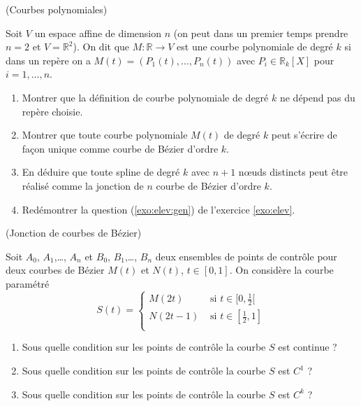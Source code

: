 \documentclass[a4paper,12pt,reqno]{amsart}
\begin{document}
\begin{exo} (Courbes polynomiales)

    Soit $V$ un espace affine de dimension $n$ (on peut dans un premier temps prendre $n=2$ et $V=\mathbb{R}^{2}$). On dit que $M:\mathbb{R} \rightarrow V$ est une courbe polynomiale de degré $k$ si dans un repère on a $M(t) = (P_{1}(t),\ldots,P_{n}(t))$ avec $P_{i} \in \mathbb{R}_{k}[X]$ pour $i=1,\ldots,n$.

  \begin{enumerate}

    \item Montrer que la définition de courbe polynomiale de degré $k$ ne dépend pas du repère choisie.

    \item Montrer que toute courbe polynomiale $M(t)$ de degré $k$ peut s'écrire de façon unique comme courbe de Bézier d'ordre $k$.

    \item En déduire que toute spline de degré $k$ avec $n+1$ nœuds distincts peut être réalisé comme la jonction de $n$ courbe de Bézier d'ordre $k$.

    \item Redémontrer la question (\ref{exo:elev:gen}) de l'exercice \ref{exo:elev}.

  \end{enumerate}
\end{exo}

\begin{exo} (Jonction de courbes de Bézier)

  Soit $A_{0}$, $A_{1}$,\dots, $A_{n}$ et $B_{0}$, $B_{1}$,\dots, $B_{n}$ deux ensembles de points de contrôle pour deux courbes de Bézier $M(t)$ et $N(t)$, $t \in [0,1]$. On considère la courbe paramétré
  $$
    S(t) =
      \begin{cases}
        M(2t) & \text{ si } t \in [0,\frac12[ \\
        N(2t-1) & \text{ si } t \in [\frac12,1] \\
      \end{cases}
  $$
  \begin{enumerate}
    \item Sous quelle condition sur les points de contrôle la courbe $S$ est continue ?

    \item Sous quelle condition sur les points de contrôle la courbe $S$ est $C^{1}$ ?

    \item Sous quelle condition sur les points de contrôle la courbe $S$ est $C^{k}$ ?
  \end{enumerate}

\end{exo}
\end{document}
